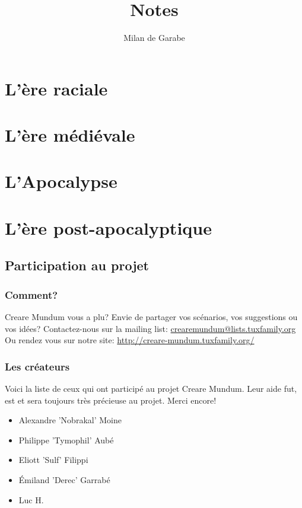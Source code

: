 \documentclass{book}
\title{Notes}
\author{Milan de Garabe}
\date{\oldstylenums{\insertdate}}
\begin{document}
\maketitle
\setcounter{tocdepth}{2} %
\renewcommand{\contentsname}{Sommaire} 
\tableofcontents
\chapter{L'ère raciale}


\chapter{L'ère médiévale}


\chapter{L'Apocalypse}


\chapter{L'ère post-apocalyptique}


\newpage
\section{Participation au projet}
\subsection{Comment?}
\hypertarget{participation}{}
Creare Mundum vous a plu? 
Envie de partager vos scénarios, vos suggestions ou vos idées?
\newline
Contactez-nous sur la mailing list: \href {mailto:crearemundum@lists.tuxfamily.org}{crearemundum@lists.tuxfamily.org}
\newline
Ou rendez vous sur notre site: \href {http://creare-mundum.tuxfamily.org/} {http://creare-mundum.tuxfamily.org/}
\subsection{Les créateurs}
Voici la liste de ceux qui ont participé au projet Creare Mundum. Leur aide fut, est et sera toujours très précieuse au projet. Merci encore!  
\begin{itemize}
\item Alexandre ’Nobrakal’ Moine 
\item Philippe ’Tymophil’ Aubé 
\item Eliott ’Sulf’ Filippi
\item Émiland ’Derec’ Garrabé
\item Luc H.
\end{itemize}
\end{document}

